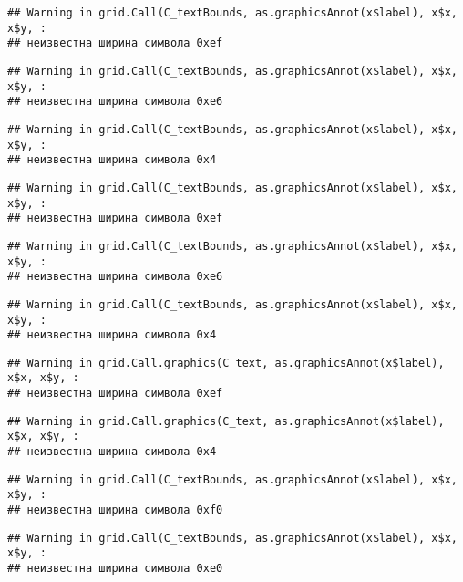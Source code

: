 \documentclass[
]{article}
\begin{document}
\begin{verbatim}
## Warning in grid.Call(C_textBounds, as.graphicsAnnot(x$label), x$x, x$y, :
## неизвестна ширина символа 0xef
\end{verbatim}

\begin{verbatim}
## Warning in grid.Call(C_textBounds, as.graphicsAnnot(x$label), x$x, x$y, :
## неизвестна ширина символа 0xe6
\end{verbatim}

\begin{verbatim}
## Warning in grid.Call(C_textBounds, as.graphicsAnnot(x$label), x$x, x$y, :
## неизвестна ширина символа 0x4
\end{verbatim}

\begin{verbatim}
## Warning in grid.Call(C_textBounds, as.graphicsAnnot(x$label), x$x, x$y, :
## неизвестна ширина символа 0xef
\end{verbatim}

\begin{verbatim}
## Warning in grid.Call(C_textBounds, as.graphicsAnnot(x$label), x$x, x$y, :
## неизвестна ширина символа 0xe6
\end{verbatim}

\begin{verbatim}
## Warning in grid.Call(C_textBounds, as.graphicsAnnot(x$label), x$x, x$y, :
## неизвестна ширина символа 0x4
\end{verbatim}

\begin{verbatim}
## Warning in grid.Call.graphics(C_text, as.graphicsAnnot(x$label), x$x, x$y, :
## неизвестна ширина символа 0xef
\end{verbatim}

\begin{verbatim}
## Warning in grid.Call.graphics(C_text, as.graphicsAnnot(x$label), x$x, x$y, :
## неизвестна ширина символа 0x4
\end{verbatim}

\begin{verbatim}
## Warning in grid.Call(C_textBounds, as.graphicsAnnot(x$label), x$x, x$y, :
## неизвестна ширина символа 0xf0
\end{verbatim}

\begin{verbatim}
## Warning in grid.Call(C_textBounds, as.graphicsAnnot(x$label), x$x, x$y, :
## неизвестна ширина символа 0xe0
\end{verbatim}
\end{document}
